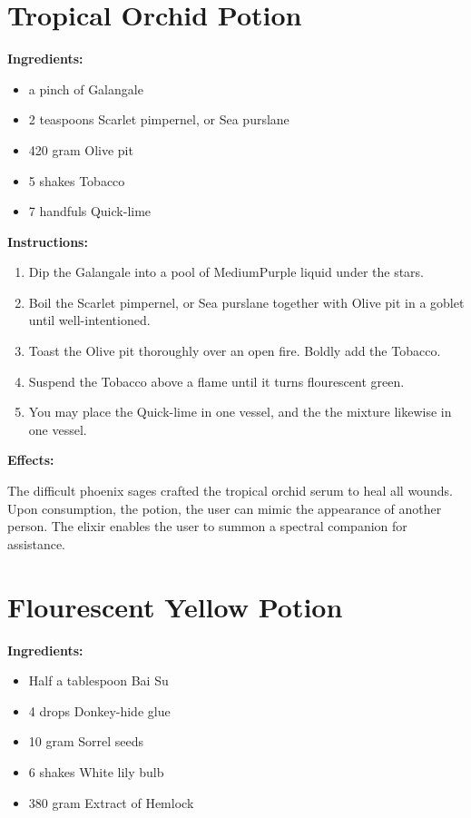 \documentclass{article}
\begin{document}
\newpage
\section*{Tropical Orchid Potion}

\textbf{Ingredients:}

\begin{itemize}
  \item a pinch of Galangale
  \item 2 teaspoons Scarlet pimpernel, or Sea purslane
  \item 420 gram Olive pit
  \item 5 shakes Tobacco
  \item 7 handfuls Quick-lime
\end{itemize}

\textbf{Instructions:}

\begin{enumerate}
  \item Dip the Galangale into a pool of MediumPurple liquid under the stars.
  \item Boil the Scarlet pimpernel, or Sea purslane together with Olive pit in a goblet until well-intentioned.
  \item Toast the Olive pit thoroughly over an open fire. Boldly add the Tobacco.
  \item Suspend the Tobacco above a flame until it turns flourescent green.
  \item You may place the Quick-lime in one vessel, and the the mixture likewise in one vessel.
\end{enumerate}

\textbf{Effects:}

The difficult phoenix sages crafted the tropical orchid serum to heal all wounds. Upon consumption, the potion, the user can mimic the appearance of another person. The elixir enables the user to summon a spectral companion for assistance.

\newpage
\section*{Flourescent Yellow Potion}

\textbf{Ingredients:}

\begin{itemize}
  \item Half a tablespoon Bai Su
  \item 4 drops Donkey-hide glue
  \item 10 gram Sorrel seeds
  \item 6 shakes White lily bulb
  \item 380 gram Extract of Hemlock
\end{itemize}
\end{document}
